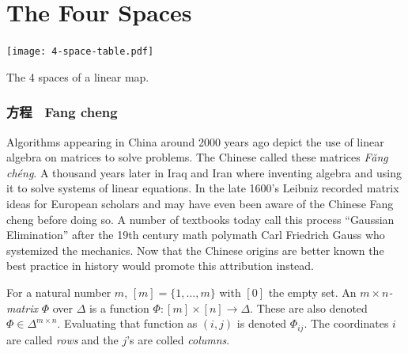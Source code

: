 \documentclass[12pt,twoside,dvipsnames,letterpaper]{memoir}
\author{James B. Wilson}
\date{\today}
\begin{document}
\chapter{The Four Spaces}


\begin{table}[!htbp]
    \centering
    \texttt{[image: 4-space-table.pdf]}
    \caption{The 4 spaces of a linear map.}
    \label{tab:4-spaces}
\end{table}
\begin{CJK*}{UTF8}{gbsn}
\subsection{ 方程 ~Fang cheng}
\end{CJK*}
Algorithms appearing in China around 2000 years
ago depict the use of linear algebra on matrices 
to solve problems.  The Chinese called these matrices 
\emph{F\u{a}ng} \emph{ch\'eng}.
A thousand years later in Iraq and Iran where inventing algebra
and using it to solve systems of linear equations.
In the late 1600's Leibniz recorded matrix ideas for European 
scholars and may have even been aware of the Chinese Fang cheng
before doing so.  
A number of textbooks today call this process
``Gaussian Elimination'' after the 19th century math polymath 
Carl Friedrich Gauss who systemized the mechanics.  
Now that the Chinese origins are better known the best 
practice in history would promote this attribution instead.

\begin{definition}
    For a natural number $m$, $[m]=\{1,\ldots,m\}$ with $[0]$
    the empty set.
    An \emph{$m\times n$-matrix} $\Phi$ over $\Delta$
    is a function $\Phi:[m]\times [n]\to \Delta$.
    These are also denoted $\Phi\in \Delta^{m\times n}$.
    Evaluating that function as $(i,j)$ is denoted 
    $\Phi_{ij}$.  The coordinates $i$ are called \emph{rows}
    and the $j$'s are colled \emph{columns}.
\end{definition}
\end{document}
